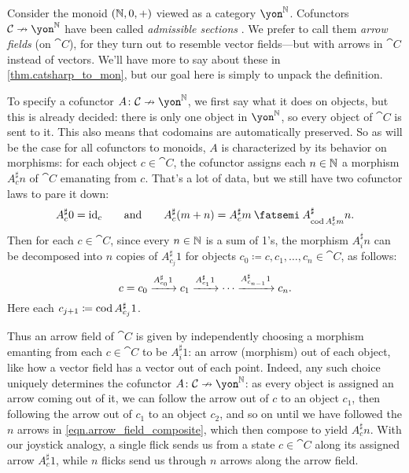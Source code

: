 \documentclass[Book-Poly]{subfiles}
\begin{document}
\begin{example}\label{ex.arrow_field}
Consider the monoid $(\mathbb{N},0,+)$ viewed as a category $\yon^\nn$.
Cofunctors $\cat{C}\cof\yon^\nn$ have been called \emph{admissible sections} \cite{aguiar1997internal}.
We prefer to call them \emph{arrow fields} (on $\cat{C}$), for they turn out to resemble vector fields---but with arrows in $\cat{C}$ instead of vectors.%
We'll have more to say about these in \cref{thm.catsharp_to_mon}, but our goal here is simply to unpack the definition.

To specify a cofunctor $A\colon\cat{C}\cof\yon^\nn$, we first say what it does on objects, but this is already decided: there is only one object in $\yon^\nn$, so every object of $\cat{C}$ is sent to it.
This also means that codomains are automatically preserved.
So as will be the case for all cofunctors to monoids, $A$ is characterized by its behavior on morphisms: for each object $c\in\cat{C}$, the cofunctor assigns each $n\in\mathbb{N}$ a morphism $A^\sharp_c n$ of $\cat{C}$ emanating from $c$.
That's a lot of data, but we still have two cofunctor laws to pare it down:
\[
    A^\sharp_c0=\id_c
        \qqand
    A^\sharp_c(m+n)=A^\sharp_c m\then A^\sharp_{\cod A^\sharp_c m}n.
\]
Then for each $c\in\cat{C}$, since every $n\in\mathbb{N}$ is a sum of 1's, the morphism $A^\sharp_i n$ can be decomposed into $n$ copies of $A^\sharp_{c_j}1$ for objects $c_0\coloneqq c,c_1,\ldots,c_n\in\cat{C}$, as follows:
\begin{equation} \label{eqn.arrow_field_composite}
    c=c_0\xrightarrow{A^\sharp_{c_0}1}c_1\xrightarrow{A^\sharp_{c_1}1}\cdots\xrightarrow{A^\sharp_{c_{n-1}}1}c_n.
\end{equation}
Here each $c_{j+1}\coloneqq\operatorname{cod} A^\sharp_{c_j}1$.

Thus an arrow field of $\cat{C}$ is given by independently choosing a morphism emanting from each $c\in\cat{C}$ to be $A^\sharp_i1$: an arrow (morphism) out of each object, like how a vector field has a vector out of each point.
Indeed, any such choice uniquely determines the cofunctor $A\colon\cat{C}\cof\yon^\nn$: as every object is assigned an arrow coming out of it, we can follow the arrow out of $c$ to an object $c_1$, then following the arrow out of $c_1$ to an object $c_2$, and so on until we have followed the $n$ arrows in \eqref{eqn.arrow_field_composite}, which then compose to yield $A^\sharp_cn$.
With our joystick analogy, a single flick sends us from a state $c\in\cat{C}$ along its assigned arrow $A^\sharp_c1$, while $n$ flicks send us through $n$ arrows along the arrow field.


\end{example}
\end{document}
